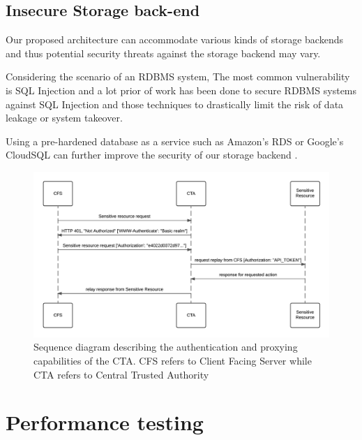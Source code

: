 \documentclass{sig-alternate-05-2015}
\begin{document}
\subsection*{Insecure Storage back-end}

Our proposed architecture can accommodate various kinds of storage backends and thus potential security threats against the storage backend may vary. 

Considering the scenario of an RDBMS system, The most common vulnerability is SQL Injection and a lot prior of work has been done to secure RDBMS systems against SQL Injection \cite{halfond_amnesia:_2005, boyd_sqlrand:_2004, halfond_classification_2006} and those techniques to drastically limit the risk of data leakage or system takeover.

Using a pre-hardened database as a service such as Amazon's RDS or Google's CloudSQL can further improve the security of our storage backend \cite{curino_relational_2011} .

\begin{figure}[!ht]
  \centering
  \includegraphics[keepaspectratio=true,scale=0.8]{sequence_diagram}
  \caption{Sequence diagram describing the authentication and proxying capabilities of the CTA. CFS refers to Client Facing Server while CTA refers to Central Trusted Authority}
  \label{fig:ctaarchitecture}
\end{figure}


\section*{Performance testing}
\end{document}
